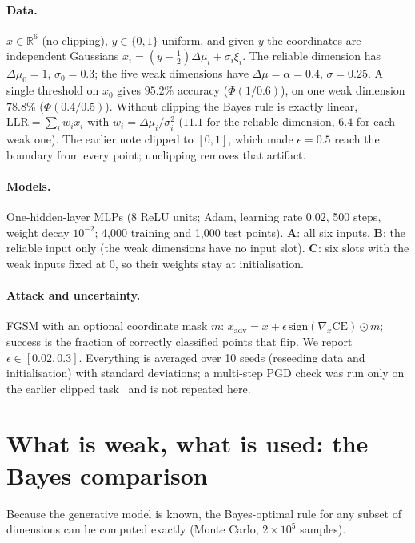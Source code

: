 \documentclass[11pt]{article}
\begin{document}
\paragraph{Data.} $x\in\mathbb R^6$ (no clipping), $y\in\{0,1\}$ uniform, and given $y$
the coordinates are independent Gaussians $x_i=(y-\tfrac12)\Delta\mu_i+\sigma_i\xi_i$.
The reliable dimension has $\Delta\mu_0=1$, $\sigma_0=0.3$; the five weak dimensions have
$\Delta\mu=\alpha=0.4$, $\sigma=0.25$. A single threshold on $x_0$ gives $95.2\%$ accuracy
($\Phi(1/0.6)$), on one weak dimension $78.8\%$ ($\Phi(0.4/0.5)$). Without clipping the Bayes
rule is exactly linear, $\mathrm{LLR}=\sum_iw_ix_i$ with $w_i=\Delta\mu_i/\sigma_i^2$
($11.1$ for the reliable dimension, $6.4$ for each weak one). The earlier note clipped to
$[0,1]$, which made $\epsilon=0.5$ reach the boundary from every point; unclipping removes that
artifact.

\paragraph{Models.} One-hidden-layer MLPs (8 ReLU units; Adam, learning rate
$0.02$, 500 steps, weight decay $10^{-2}$; 4{,}000 training and 1{,}000 test
points). \textbf{A}: all six inputs. \textbf{B}: the reliable input only (the weak
dimensions have no input slot). \textbf{C}: six slots with the weak inputs fixed
at $0$, so their weights stay at initialisation.

\paragraph{Attack and uncertainty.} FGSM with an optional coordinate mask
$m$: $x_{\mathrm{adv}}=x+\epsilon\,\mathrm{sign}(\nabla_x\mathrm{CE})\odot m$;
success is the fraction of correctly classified points that flip. We report
$\epsilon\in[0.02,0.3]$. Everything is averaged over 10 seeds (reseeding data and
initialisation) with standard deviations; a multi-step PGD check was run only on the earlier clipped task~\cite{earlier} and
is not repeated here.

\section{What is weak, what is used: the Bayes comparison}
\label{sec:bayes}

Because the generative model is known, the Bayes-optimal rule for any subset of
dimensions can be computed exactly (Monte Carlo, $2\times10^5$ samples).
\end{document}
